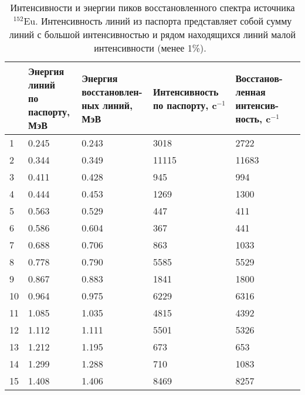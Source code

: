 \begin{table}[htbp]
    \centering
    \begin{threeparttable}
      \caption{ Интенсивности и энергии пиков восстановленного спектра источника ${}^{152}$Eu. Интенсивность линий из паспорта представляет собой сумму линий с большой интенсивностью и рядом находящихся линий малой интенсивности (менее 1\%).~\cite{Khilkevitch2013} }
        \label{tab:euReconstructedLines}
        \begin{tabular}{| p{1cm} | p{3.5cm} | p{3.5cm} | p{3.5cm} | p{3.5cm} | }
            \hline
            \makecell{\textnumero} & \makecell{ Энергия линий \\ по паспорту, \\ МэВ } & \makecell{ Энергия \\ восстановлен-\\ных линий, МэВ } & 
                \makecell{Интенсивность \\ по паспорту, c${}^{-1}$} & \makecell{Восстанов-\\ленная \\ интенсив-\\ность, c${}^{-1}$ } \\
            \hline
             1 & 0.245 & 0.243 & 3018 & 2722 \\
             2 & 0.344 & 0.349 & 11115 & 11683 \\
             3 & 0.411 & 0.428 & 945 & 994 \\
             4 & 0.444 & 0.453 & 1269 & 1300 \\
             5 & 0.563 & 0.529 & 447 & 411 \\
             6 & 0.586 & 0.604 & 367 & 441 \\
             7 & 0.688 & 0.706 & 863 & 1033 \\
             8 & 0.778 & 0.790 & 5585 & 5529 \\
             9 & 0.867 & 0.883 & 1841 & 1800 \\
             10 & 0.964 & 0.975 & 6229 & 6316 \\
             11 & 1.085 & 1.035 & 4815 & 4392 \\
             12 & 1.112 & 1.111 & 5501 & 5326 \\
             13 & 1.212 & 1.195 & 673 & 653 \\
             14 & 1.299 & 1.288 & 710 & 1083 \\
             15 & 1.408 & 1.406 & 8469 & 8257 \\
            \hline
        \end{tabular}
    \end{threeparttable}
\end{table}

